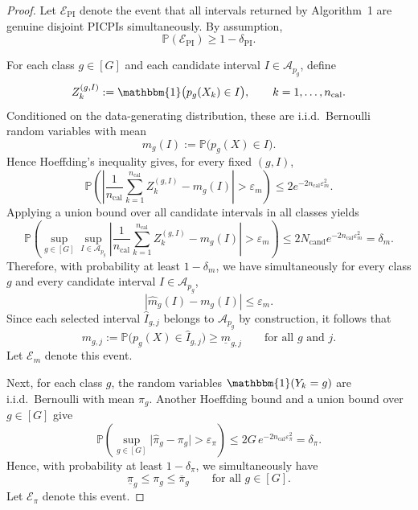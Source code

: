 \documentclass[11pt]{article}
\theoremstyle{statplain}
\theoremstyle{statdefinition}
\newcommand{\PP}{\mathbb{P}}
\newcommand{\0}{\mathbf{0}}
\newcommand{\numClass}{G} %
\newcommand{\iteratorClass}{g}
\newcommand{\titleShorts}{PICPIs\xspace}
\begin{document}
\begin{proof}
Let $\mathcal{E}_{\mathrm{PI}}$ denote the event that all intervals returned by Algorithm~1 are genuine disjoint \titleShorts simultaneously.
By assumption,
\[
\PP(\mathcal{E}_{\mathrm{PI}})\ge 1-\delta_{\mathrm{PI}}.
\]

For each class $\iteratorClass\in[\numClass]$ and each candidate interval $I\in\mathcal{A}_{p_\iteratorClass}$, define
\[
Z_k^{(\iteratorClass,I)}
:=
\mathbbm{1}\bigl(p_\iteratorClass(X_k)\in I\bigr),
\qquad
k=1,\ldots,n_{\mathrm{cal}}.
\]
Conditioned on the data-generating distribution, these are i.i.d.\ Bernoulli random variables with mean
\[
m_{\iteratorClass}(I)
:=
\PP\bigl(p_\iteratorClass(X)\in I\bigr).
\]
Hence Hoeffding's inequality gives, for every fixed $(\iteratorClass,I)$,
\[
\PP\left(
\left|
\frac{1}{n_{\mathrm{cal}}}\sum_{k=1}^{n_{\mathrm{cal}}} Z_k^{(\iteratorClass,I)}
-
m_{\iteratorClass}(I)
\right|
>
\varepsilon_m
\right)
\le
2e^{-2n_{\mathrm{cal}}\varepsilon_m^2}.
\]
Applying a union bound over all candidate intervals in all classes yields
\[
\PP\left(
\sup_{\iteratorClass\in[\numClass]}
\sup_{I\in\mathcal{A}_{p_\iteratorClass}}
\left|
\frac{1}{n_{\mathrm{cal}}}\sum_{k=1}^{n_{\mathrm{cal}}} Z_k^{(\iteratorClass,I)}
-
m_{\iteratorClass}(I)
\right|
>
\varepsilon_m
\right)
\le
2N_{\mathrm{cand}}e^{-2n_{\mathrm{cal}}\varepsilon_m^2}
=
\delta_m.
\]
Therefore, with probability at least $1-\delta_m$, we have simultaneously for every class $\iteratorClass$ and every candidate interval $I\in \mathcal{A}_{p_\iteratorClass}$,
\[
\left|
\widehat m_{\iteratorClass}(I)-m_{\iteratorClass}(I)
\right|
\le
\varepsilon_m.
\]
Since each selected interval $\widehat I_{\iteratorClass,j}$ belongs to $\mathcal{A}_{p_\iteratorClass}$ by construction, it follows that
\[
m_{\iteratorClass,j}
:=
\PP\bigl(p_\iteratorClass(X)\in \widehat I_{\iteratorClass,j}\bigr)
\ge
\underline m_{\iteratorClass,j}
\qquad
\text{for all } \iteratorClass \text{ and } j.
\]
Let $\mathcal{E}_m$ denote this event.

Next, for each class $\iteratorClass$, the random variables $\mathbbm{1}(Y_k=\iteratorClass)$ are i.i.d.\ Bernoulli with mean $\pi_\iteratorClass$.
Another Hoeffding bound and a union bound over $\iteratorClass\in[\numClass]$ give
\[
\PP\left(
\sup_{\iteratorClass\in[\numClass]}
\bigl|
\widehat\pi_\iteratorClass-\pi_\iteratorClass
\bigr|
>
\varepsilon_\pi
\right)
\le
2\numClass\,e^{-2n_{\mathrm{cal}}\varepsilon_\pi^2}
=
\delta_\pi.
\]
Hence, with probability at least $1-\delta_\pi$, we simultaneously have
\[
\underline\pi_\iteratorClass
\le
\pi_\iteratorClass
\le
\overline\pi_\iteratorClass
\qquad
\text{for all }\iteratorClass\in[\numClass].
\]
Let $\mathcal{E}_\pi$ denote this event.


\end{proof}
\end{document}
